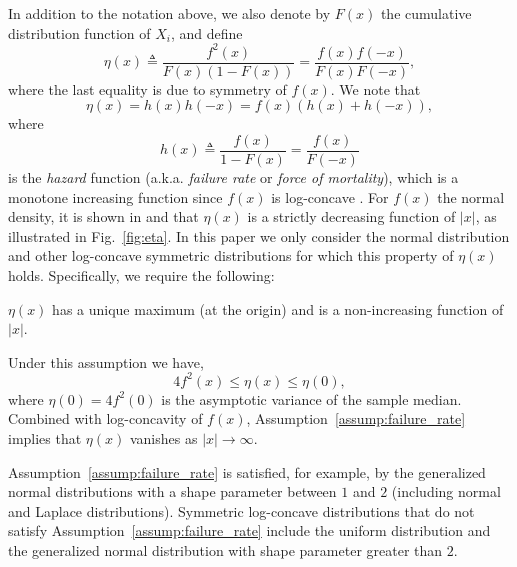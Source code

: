 In addition to the notation above, we also denote by $F(x)$ the cumulative distribution function of $X_i$, and define
\begin{equation} \label{eq:eta_def}
\eta(x) \triangleq \frac{f^2(x)}{F(x)(1-F(x))} =  \frac{f(x)f(-x)}{F(x)F(-x)}, 
\end{equation}
where the last equality is due to symmetry of $f(x)$. We note that 
\begin{equation}
\label{eq:eta_h}
\eta(x) = h(x)h(-x) = f(x) \left( h(x) + h(-x) \right), 
\end{equation}
where 
\[
h(x) \triangleq \frac{f(x)}{1-F(x)} = \frac{f(x)}{F(-x)}
\]
is the \emph{hazard} function (a.k.a. \emph{failure rate} or \emph{force of mortality}), which is a monotone increasing function since $f(x)$ is log-concave \cite{bagnoli2005log}. 
%
For $f(x)$ the normal density, it is shown in \cite{Samford1953} and \cite{hammersley1950estimating} that $\eta(x)$ is a strictly decreasing function of $|x|$, as illustrated in Fig.~\ref{fig:eta}. 
%
In this paper we only consider the normal distribution and other log-concave symmetric distributions for which this property of $\eta(x)$ holds. Specifically, we require the following:
\begin{assump} \label{assump:failure_rate}
 $\eta(x)$ has a unique maximum (at the origin) and is a non-increasing function of $|x|$. 
\end{assump}
Under this assumption we have, 
\[
4f^2(x) \leq \eta(x) \leq \eta(0),
\] 
%
where $\eta(0) = 4 f^2(0)$ is the asymptotic variance of the sample median. Combined with log-concavity of $f(x)$, Assumption~\ref{assump:failure_rate} implies that $\eta(x)$ vanishes as $|x|\rightarrow \infty$. \par
%
Assumption~\ref{assump:failure_rate} is satisfied, for example, by the generalized normal distributions with a shape parameter between $1$ and $2$ (including normal and Laplace distributions). Symmetric log-concave distributions that do not satisfy Assumption~\ref{assump:failure_rate} include the uniform distribution and the generalized normal distribution with shape parameter greater than $2$.\par

